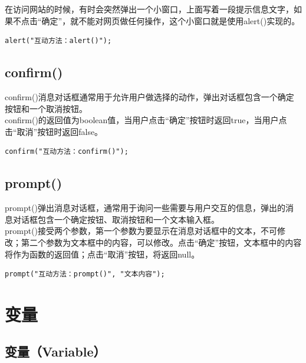 在访问网站的时候，有时会突然弹出一个小窗口，上面写着一段提示信息文字，如果不点击“确定”，就不能对网页做任何操作，这个小窗口就是使用alert()实现的。 \\

\begin{lstlisting}[style=htmlcssjs]
alert("互动方法：alert()");
\end{lstlisting}

\subsection{confirm()}

confirm()消息对话框通常用于允许用户做选择的动作，弹出对话框包含一个确定按钮和一个取消按钮。 \\

confirm()的返回值为boolean值，当用户点击“确定”按钮时返回true，当用户点击“取消”按钮时返回false。 \\

\begin{lstlisting}[style=htmlcssjs]
confirm("互动方法：confirm()");
\end{lstlisting}

\subsection{prompt()}

prompt()弹出消息对话框，通常用于询问一些需要与用户交互的信息，弹出的消息对话框包含一个确定按钮、取消按钮和一个文本输入框。 \\

prompt()接受两个参数，第一个参数为要显示在消息对话框中的文本，不可修改；第二个参数为文本框中的内容，可以修改。点击“确定”按钮，文本框中的内容将作为函数的返回值；点击“取消”按钮，将返回null。 \\

\begin{lstlisting}[style=htmlcssjs]
prompt("互动方法：prompt()", "文本内容");
\end{lstlisting}

\newpage

\section{变量}

\subsection{变量（Variable）}

